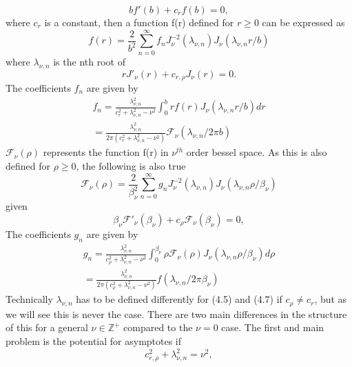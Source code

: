 \documentclass[10pt]{article}
\numberwithin{equation}{section}
\begin{document}
\begin{multicols}{2}
\begin{equation}
 bf'(b) +c_{r}f(b)=0, 
\end{equation}
where $c_{r}$ is a constant, then a function f(r) defined for $r\geqslant0$ can be expressed as 
\begin{equation}
f(r) = \frac{2}{b^{2}}\sum_{n=0}^{\infty}f_{n}J_{\nu}^{-2}(\lambda_{\nu,n})J_{\nu}(\lambda_{\nu,n}r/b)
\end{equation}
where $\lambda_{\nu,n}$ is the nth root of 
\begin{equation}
rJ'_{\nu}(r)+c_{r,\rho}J_{\nu}(r)=0.
\end{equation}
The coefficients $f_{n}$ are given by
\begin{multline}
f_{n} = \frac{\lambda^{2}_{\nu,n}}{c^{2}_{r}+\lambda^{2}_{\nu,n}-\nu^{2}} \int_{0}^{b}rf(r)J_{\nu}(\lambda_{\nu,n}r/b)dr \\= \frac{\lambda^{2}_{\nu,n}}{2\pi(c^{2}_{r}+\lambda^{2}_{\nu,n}-\nu^{2})} \mathcal{F}_{\nu}(\lambda_{\nu,n}/2\pi b)
\end{multline}
 $\mathcal{F}_{\nu}(\rho)$ represents the function f(r) in $\nu^{th}$ order bessel space. As this is also defined for  $\rho\geqslant0$, the following is also true
\begin{equation}
\mathcal{F}_{\nu}(\rho)= \frac{2}{\beta_{\nu}^{2}}\sum_{n=0}^{\infty}g_{n}J_{\nu}^{-2}(\lambda_{\nu,n})J_{\nu}(\lambda_{\nu,n}\rho/\beta_{\nu})
\end{equation}
given 
\begin{equation}
\beta_{\nu}\mathcal{F}'_{\nu}(\beta_{\nu})+c_{\rho}\mathcal{F}_{\nu}(\beta_{\nu})=0, 
\end{equation}
The coefficients $g_{n}$ are given by
\begin{multline}
g_{n} = \frac{\lambda^{2}_{\nu,n}}{c^{2}_{\rho}+\lambda^{2}_{\nu,n}-\nu^{2}} \int_{0}^{\beta_{\nu}}\rho\mathcal{F}_{\nu}(\rho)J_{\nu}(\lambda_{\nu,n}\rho/\beta_{\nu})d\rho \\= \frac{\lambda^{2}_{\nu,n}}{2\pi(c^{2}_{\rho}+\lambda^{2}_{\nu,n}-\nu^{2})}f(\lambda_{\nu,n}/2\pi\beta_{\nu})
\end{multline}
Technically $\lambda_{\nu,n}$ has to be defined differently for (4.5) and (4.7) if $c_{\rho} \neq c_{r}$, but as we will see this is never the case.
There are two main differences in the structure of this for a general $\nu\in\mathbb{Z}^{+}$ compared to the $\nu=0$ case. The first and main problem is the potential for asymptotes if 
\begin{equation}
c^{2}_{r,\rho}+\lambda^{2}_{\nu,n}=\nu^{2}, 

\end{equation}
\end{multicols}
\end{document}

